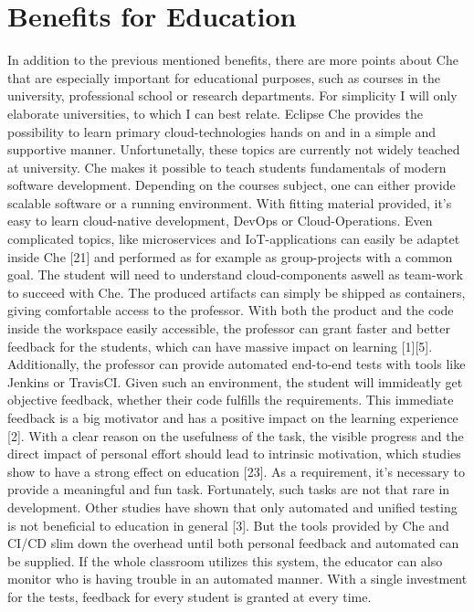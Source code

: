 \documentclass[utf8,biblatex]{lni}
\begin{document}
\section{Benefits for Education}
In addition to the previous mentioned benefits, there are more points about Che that are especially important for educational purposes, such as courses in the university, professional school or research departments.
For simplicity I will only elaborate universities, to which I can best relate.
Eclipse Che provides the possibility to learn primary cloud-technologies hands on and in a simple and supportive manner. 
Unfortunetally, these topics are currently not widely teached at university.
Che makes it possible to teach students fundamentals of modern software development.
Depending on the courses subject, one can either provide scalable software or a running environment. 
With fitting material provided, it's easy to learn cloud-native development, DevOps or Cloud-Operations. 
Even complicated topics, like microservices and IoT-applications can easily be adaptet inside Che [21] and performed as for example as group-projects with a common goal. 
The student will need to understand cloud-components aswell as team-work to succeed with Che. 
The produced artifacts can simply be shipped as containers, giving comfortable access to the professor. 
With both the product and the code inside the workspace easily accessible, the professor can grant faster and better feedback for the students, which can have massive impact on learning [1][5].
Additionally, the professor can provide automated end-to-end tests with tools like Jenkins or TravisCI. 
Given such an environment, the student will immideatly get objective feedback, whether their code fulfills the requirements. 
This immediate feedback is a big motivator and has a positive impact on the learning experience [2]. 
With a clear reason on the usefulness of the task, the visible progress and the direct impact of personal effort should lead to intrinsic motivation, which studies show to have a strong effect on education [23]. 
As a requirement, it's necessary to provide a meaningful and fun task. 
Fortunately, such tasks are not that rare in development.  
Other studies have shown that only automated and unified testing is not beneficial to education in general [3]. 
But the tools provided by Che and CI/CD slim down the overhead until both personal feedback and automated can be supplied. 
If the whole classroom utilizes this system, the educator can also monitor who is having trouble in an automated manner. 
With a single investment for the tests, feedback for every student is granted at every time. 
\end{document}
